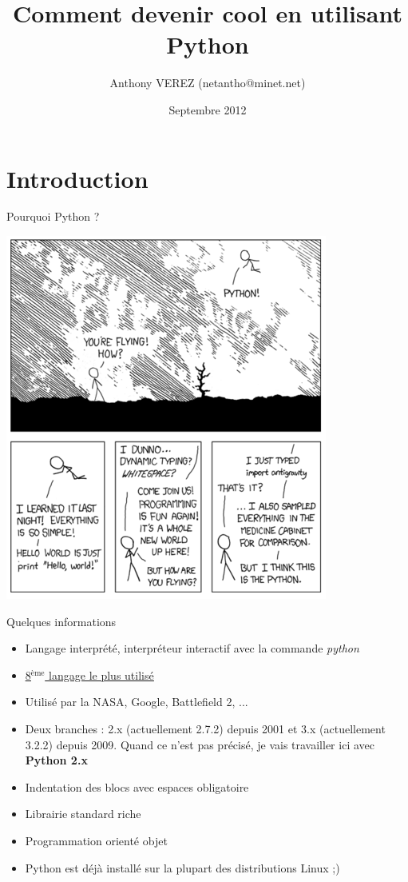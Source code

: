 \documentclass{beamer}
\title{Comment devenir cool en utilisant Python}
\author{Anthony VEREZ (netantho@minet.net)}
\date{Septembre 2012}
\begin{document}
\begin{frame}
\titlepage
\end{frame}

\section{Introduction}

\begin{frame}{Pourquoi Python ?}
 \begin{center}
 \includegraphics[scale=0.3]{./Python_cartoon.png}
\end{center}

\end{frame}

\begin{frame}{Quelques informations}
\begin{itemize}
 \item Langage interprété, interpréteur interactif avec la commande \textit{python}
 \item \underline{\href{http://www.tiobe.com/index.php/content/paperinfo/tpci/index.html}{8$^{\text{ème}}$ langage le plus utilisé}}
 \item Utilisé par la NASA, Google, Battlefield 2, ...
 \item Deux branches : 2.x (actuellement 2.7.2) depuis 2001 et 3.x (actuellement 3.2.2) depuis 2009. Quand ce n'est pas précisé, je vais travailler ici avec \textbf{Python 2.x}
 \item Indentation des blocs avec espaces obligatoire
 \item Librairie standard riche
 \item Programmation orienté objet
 \item Python est déjà installé sur la plupart des distributions Linux ;)
\end{itemize}
\end{frame}
\end{document}
